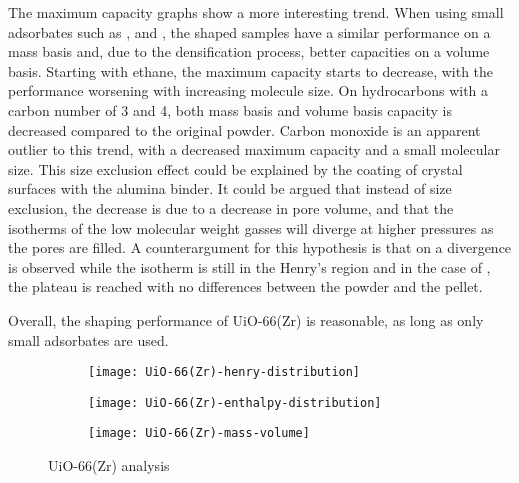 The maximum capacity graphs show a more interesting trend. When using small adsorbates
such as ,  and , the shaped samples have a similar performance 
on a mass basis and, due to the densification process, better capacities on a volume
basis. Starting with ethane, the maximum capacity starts to decrease, with the performance
worsening with increasing molecule size. On hydrocarbons with a carbon number of 3 and 4,
both mass basis and volume basis capacity is decreased compared to the original powder.
Carbon monoxide is an apparent outlier to this trend, with a decreased maximum capacity
and a small molecular size. 
This size exclusion effect could be explained by the coating of crystal surfaces with 
the alumina binder.
It could be argued that instead of size exclusion, the decrease is due to
a decrease in pore volume, and that the isotherms of the low molecular 
weight gasses will diverge at higher pressures as the pores are filled. 
A counterargument for this hypothesis is that on  a divergence 
is observed while the isotherm is still in the Henry's region and in the 
case of , the plateau is reached with no differences between the 
powder and the pellet.

Overall, the shaping performance of UiO-66(Zr) is 
reasonable, as long as only small adsorbates are used.

\begin{figure}
    \centering
    \begin{subfigure}{0.8\textwidth}
        \parbox[c]{0.1\linewidth}{\caption{}\label{fig:analysisuio66henry}}%
        \parbox[b]{0.7\linewidth}{%
        \texttt{[image: UiO-66(Zr)-henry-distribution]}%
        }%
    \end{subfigure}

    \begin{subfigure}{0.8\textwidth}
        \parbox[c]{0.1\linewidth}{\caption{}\label{fig:analysisuio66enth}}%
        \parbox[b]{0.7\linewidth}{%
        \texttt{[image: UiO-66(Zr)-enthalpy-distribution]}%
        }%
    \end{subfigure}

    \begin{subfigure}{0.8\textwidth}
        \parbox[c]{0.1\linewidth}{\caption{}\label{fig:analysisuio66basis}}%
        \parbox[b]{0.7\linewidth}{%
        \texttt{[image: UiO-66(Zr)-mass-volume]}%
        }%
    \end{subfigure}
    
    \caption{UiO-66(Zr) analysis}%
    \label{fig:analysisuio66}
\end{figure}

